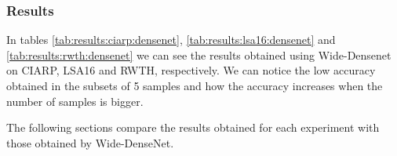 \subsubsection{Results}

In tables \ref{tab:results:ciarp:densenet}, \ref{tab:results:lsa16:densenet} and \ref{tab:results:rwth:densenet} we can see the results obtained using Wide-Densenet on CIARP, LSA16 and RWTH, respectively. We can notice the low accuracy obtained in the subsets of 5 samples and how the accuracy increases when the number of samples is bigger.

The following sections compare the results obtained for each experiment with those obtained by Wide-DenseNet.

\doublerulesep 0.1pt
\begin{table*}[!ht]
\begin{footnotesize}
\caption{Accuracy obtained by Wide-DenseNet on CIARP as number of training samples is varied.} \label{tab:results:ciarp:densenet}
\end{footnotesize}
\end{table*}


\doublerulesep 0.1pt
\begin{table*}[!ht]
\begin{footnotesize}
\caption{Accuracy of Wide-DenseNet on LSA16 as number of training samples is varied.} \label{tab:results:lsa16:densenet}
\end{footnotesize}
\end{table*}


